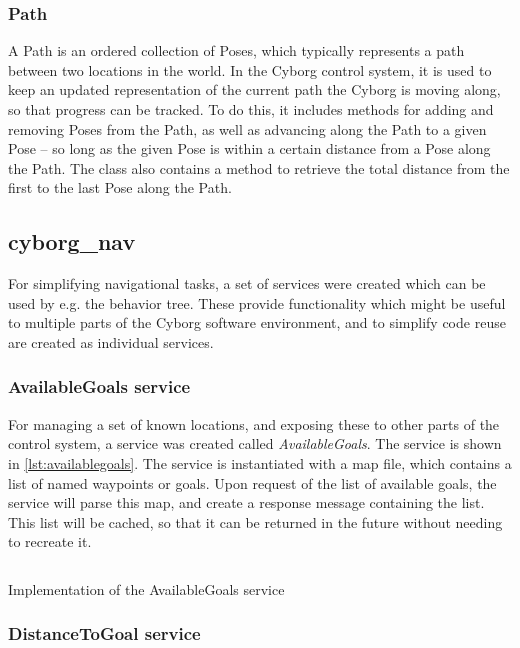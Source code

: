 \documentclass[\rootfolder/main.tex]{subfiles}
\begin{document}
\subsubsection{Path}

A Path is an ordered collection of Poses, which typically represents a path between two locations in the world.
In the Cyborg control system, it is used to keep an updated representation of the current path the Cyborg is moving along, so that progress can be tracked.
To do this, it includes methods for adding and removing Poses from the Path, as well as advancing along the Path to a given Pose -- so long as the given Pose is within a certain distance from a Pose along the Path.
The class also contains a method to retrieve the total distance from the first to the last Pose along the Path.

\subsection{cyborg\_nav}

For simplifying navigational tasks, a set of services were created which can be used by e.g. the behavior tree.
These provide functionality which might be useful to multiple parts of the Cyborg software environment, and to simplify code reuse are created as individual services.

\subsubsection{AvailableGoals service}

For managing a set of known locations, and exposing these to other parts of the control system, a service was created called \emph{AvailableGoals}.
The service is shown in \cref{lst:availablegoals}.
The service is instantiated with a map file, which contains a list of named waypoints or goals.
Upon request of the list of available goals, the service will parse this map, and create a response message containing the list.
This list will be cached, so that it can be returned in the future without needing to recreate it.

\begin{listing}
    \inputminted{python}{\rootfolder/Chapters/Chapter6/Listings/available_goals.py}
    \caption{Implementation of the AvailableGoals service \label{lst:availablegoals}}
\end{listing}

\subsubsection{DistanceToGoal service}
\end{document}
